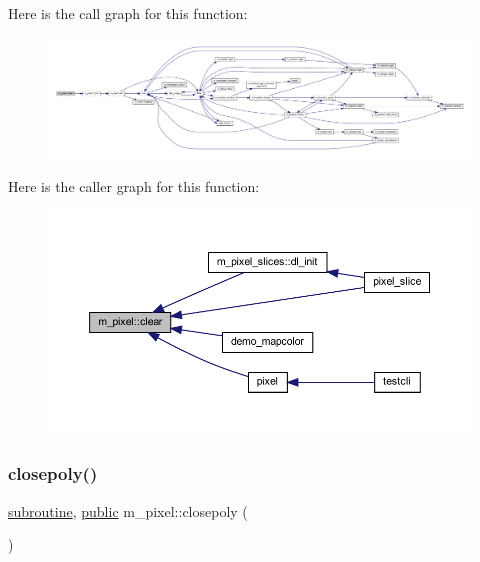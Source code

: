 Here is the call graph for this function\+:
\nopagebreak
\begin{figure}[H]
\begin{center}
\leavevmode
\includegraphics[width=350pt]{namespacem__pixel_af3b81a21a0b2f6b5eddd09c031bd6173_cgraph}
\end{center}
\end{figure}
Here is the caller graph for this function\+:
\nopagebreak
\begin{figure}[H]
\begin{center}
\leavevmode
\includegraphics[width=350pt]{namespacem__pixel_af3b81a21a0b2f6b5eddd09c031bd6173_icgraph}
\end{center}
\end{figure}
\mbox{\label{namespacem__pixel_ab3dc83b63d2ab1bf3f63932abca4245d}} 
\subsubsection{\texorpdfstring{closepoly()}{closepoly()}}
{\footnotesize\ttfamily \hyperlink{M__stopwatch_83_8txt_acfbcff50169d691ff02d4a123ed70482}{subroutine}, \hyperlink{M__stopwatch_83_8txt_a2f74811300c361e53b430611a7d1769f}{public} m\+\_\+pixel\+::closepoly (\begin{DoxyParamCaption}{ }\end{DoxyParamCaption})}



